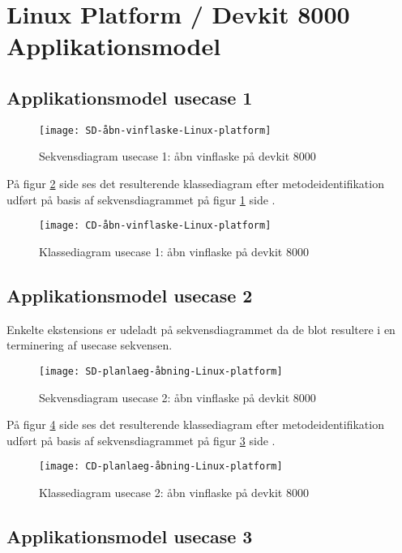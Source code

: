 \section{Linux Platform / Devkit 8000 Applikationsmodel}

\subsection{Applikationsmodel usecase 1}
\begin{figure}[H]
\caption{Sekvensdiagram usecase 1: åbn vinflaske på devkit 8000}
\label{SD:UC1-devkit}
\texttt{[image: SD-åbn-vinflaske-Linux-platform]}
\end{figure}

På figur \ref{CD:UC1-devkit} side \pageref{CD:UC1-devkit} ses det resulterende klassediagram efter metodeidentifikation udført på basis af sekvensdiagrammet på figur \ref{SD:UC1-devkit} side \pageref{SD:UC1-devkit}.
\begin{figure}[H]
	\caption{Klassediagram usecase 1: åbn vinflaske på devkit 8000}
	\label{CD:UC1-devkit}
	\texttt{[image: CD-åbn-vinflaske-Linux-platform]}
\end{figure}

\subsection{Applikationsmodel usecase 2}

Enkelte ekstensions er udeladt på sekvensdiagrammet da de blot resultere i en terminering af usecase sekvensen.

\begin{figure}[H]
	\caption{Sekvensdiagram usecase 2: åbn vinflaske på devkit 8000}
	\label{SD:UC2-devkit}
	\texttt{[image: SD-planlaeg-åbning-Linux-platform]}
\end{figure}

På figur \ref{CD:UC2-devkit} side \pageref{CD:UC2-devkit} ses det resulterende klassediagram efter metodeidentifikation udført på basis af sekvensdiagrammet på figur \ref{SD:UC2-devkit} side \pageref{SD:UC2-devkit}.
\begin{figure}[H]
	\caption{Klassediagram usecase 2: åbn vinflaske på devkit 8000}
	\label{CD:UC2-devkit}
	\texttt{[image: CD-planlaeg-åbning-Linux-platform]}
\end{figure}

\subsection{Applikationsmodel usecase 3}

